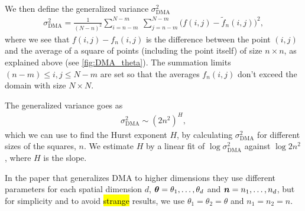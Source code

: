We then define the generalized variance $\sigma_\text{DMA}^2$
\begin{align*}
    \sigma_\text{DMA}^2 
    = \frac{1}{(N-n)^2}\sum_{i=n-m}^{N-m} ~ \sum_{j=n-m}^{N-m} 
    \big(
        f(i,j) - \tilde f_n(i,j)
    \big)^2,
\end{align*}
where we see that $f(i,j) - f_n(i,j)$ is the difference between the point $(i,j)$ and the average of a square of points (including the point itself) of size $n \times n$, as explained above (see \cref{fig:DMA_theta}).
The summation limits $(n-m) \leq i,j \leq N-m$ are set so that the averages $f_n(i,j)$ don't exceed the domain with size $N \times N$.

The generalized variance goes as
\begin{align*}
    \sigma_\text{DMA}^2 \sim \left(2n^2\right)^H,
\end{align*}
which we can use to find the Hurst exponent $H$, by calculating $\sigma_\text{DMA}^2$ for different sizes of the squares, $n$. We estimate $H$ by a linear fit of $\log \sigma_\text{DMA}^2$ against $\log 2n^2$, where $H$ is the slope.

In the paper that generalizes DMA to higher dimensions\cite{carbone2007algorithm} they use different parameters for each spatial dimension $d$, $\bm{\theta} = \theta_1, \dots, \theta_d$ and $\bm{n} = n_1, \dots, n_d$, but for simplicity and to avoid \hl{strange} results, we use $\theta_1 = \theta_2 = \theta$ and $n_1 = n_2 = n$.



